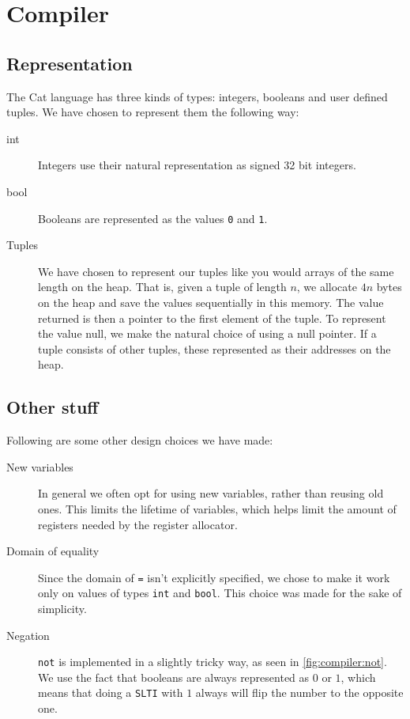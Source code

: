 \chapter{Compiler}

\section{Representation}
The Cat language has three kinds of types: integers, booleans and user defined
tuples. We have chosen to represent them the following way:

\begin{description}
    \item[int] {
        Integers use their natural representation as signed 32 bit integers.
    }
    \item[bool] {
        Booleans are represented as the values \texttt{0} and \texttt{1}.
    }
    \item[Tuples] {
        We have chosen to represent our tuples like you would arrays of the
        same length on the heap. That is, given a tuple of length $n$, we
        allocate $4n$ bytes on the heap and save the values sequentially in
        this memory. The value returned is then a pointer to the first element
        of the tuple. To represent the value null, we make the natural choice
        of using a null pointer. If a tuple consists of other tuples, these
        represented as their addresses on the heap.
    }
\end{description}


\section{Other stuff}
Following are some other design choices we have made:

\begin{description}
\item [New variables] In general we often opt for using new variables, rather
        than reusing old ones. This limits the lifetime of variables, which
        helps limit the amount of registers needed by the register allocator.

\item [Domain of equality] Since the domain of \texttt{=} isn't explicitly
        specified, we chose to make it work only on values of types
        \texttt{int} and \texttt{bool}. This choice was made for the sake of
        simplicity.

\item [Negation] \texttt{not} is implemented in a slightly tricky way, as seen
        in \autoref{fig:compiler:not}. We use the fact that booleans are always
        represented as $0$ or $1$, which means that doing a \texttt{SLTI} with
        $1$ always will flip the number to the opposite one.
\end{description}

